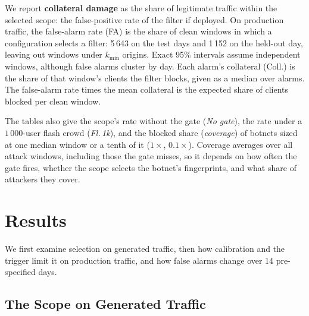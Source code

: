 \documentclass[conference,letterpaper,10pt]{IEEEtran}
\newcommand\1{\textit{(i)}}
\newcommand\2{\textit{(ii)}}
\newcommand\3{\textit{(iii)}}
\newcommand\4{\textit{(iv)}}
\newcommand\5{\textit{(v)}}
\newcommand\6{\textit{(vi)}}
\newcommand\7{\textit{(vii)}}
\newcommand\8{\textit{(viii)}}
\newcommand\9{\textit{(ix)}}
\begin{document}
We report \textbf{collateral damage} as the share
of legitimate traffic within the selected scope:
the false-positive rate of the filter if deployed. On
production traffic, the false-alarm
rate (FA) is the share of clean windows in which a
configuration selects a filter: 5\,643 on the test days and
1\,152 on the held-out day, leaving out windows under
$k_{\min}$ origins. Exact 95\% intervals assume
independent windows, although false alarms cluster by day.
Each alarm's collateral (Coll.) is the share of that
window's clients the filter blocks, given as a median over
alarms. The false-alarm rate times the mean collateral is
the expected share
of clients blocked per clean window.

The tables also give the scope's rate without the gate
(\textit{No gate}), the rate under a $1\,000$-user flash
crowd (\textit{Fl.\,1k}), and the blocked share
(\textit{coverage}) of botnets sized at one median window or
a tenth of it ($1\times$, $0.1\times$).
Coverage averages over all attack windows, including those
the gate misses, so it depends on how often the gate fires,
whether the scope selects the botnet's fingerprints, and
what share of attackers they cover.

\section{Results}
\label{sec:results}

We first examine selection on generated traffic, then how
calibration and the trigger limit it on production traffic,
and how false alarms
change over 14 pre-specified days.

\subsection{The Scope on Generated Traffic}
\label{sec:symbolic-detector}
\label{sec:collateral}
\label{sec:ablation}
\end{document}
